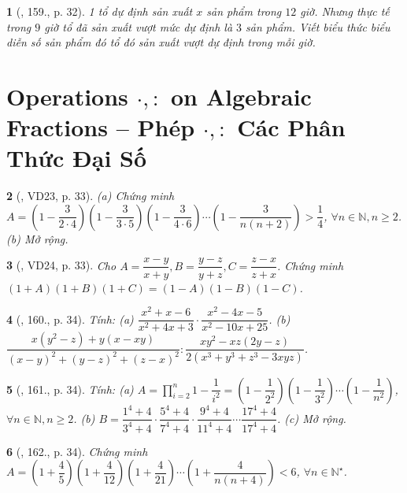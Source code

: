 \documentclass{article}
\newtheorem{baitoan}{}
\begin{document}
\begin{baitoan}[\cite{Tuyen_Toan_8}, 159., p. 32]
	1 tổ dự định sản xuất $x$ sản phẩm trong $12$ giờ. Nhưng thực tế trong $9$ giờ tổ đã sản xuất vượt mức dự định là $3$ sản phẩm. Viết biểu thức biểu diễn số sản phẩm đó tổ đó sản xuất vượt dự định trong mỗi giờ.
\end{baitoan}


\section{Operations $\cdot,:$ on Algebraic Fractions -- Phép $\cdot,:$ Các Phân Thức Đại Số}

\begin{baitoan}[\cite{Tuyen_Toan_8}, VD23, p. 33]
	(a) Chứng minh $A = \left(1 - \dfrac{3}{2\cdot4}\right)\left(1 - \dfrac{3}{3\cdot5}\right)\left(1 - \dfrac{3}{4\cdot6}\right)\cdots\left(1 - \dfrac{3}{n(n + 2)}\right) > \dfrac{1}{4}$, $\forall n\in\mathbb{N},n\ge2$. (b) Mở rộng.
\end{baitoan}

\begin{baitoan}[\cite{Tuyen_Toan_8}, VD24, p. 33]
	Cho $A = \dfrac{x - y}{x + y},B = \dfrac{y - z}{y + z},C = \dfrac{z - x}{z + x}$. Chứng minh $(1 + A)(1 + B)(1 + C) = (1 - A)(1 - B)(1 - C)$.
\end{baitoan}

\begin{baitoan}[\cite{Tuyen_Toan_8}, 160., p. 34]
	Tính: (a) $\dfrac{x^2 + x - 6}{x^2 + 4x + 3}\cdot\dfrac{x^2 - 4x - 5}{x^2 - 10x + 25}$. (b) $\dfrac{x(y^2 - z) + y(x - xy)}{(x - y)^2 + (y - z)^2 + (z - x)^2}:\dfrac{xy^2 - xz(2y - z)}{2(x^3 + y^3 + z^3 - 3xyz)}$.
\end{baitoan}

\begin{baitoan}[\cite{Tuyen_Toan_8}, 161., p. 34]
	Tính: (a) $A = \prod_{i=2}^n 1 - \dfrac{1}{i^2} = \left(1 - \dfrac{1}{2^2}\right)\left(1 - \dfrac{1}{3^2}\right)\cdots\left(1 - \dfrac{1}{n^2}\right)$, $\forall n\in\mathbb{N},n\ge2$. (b) $B = \dfrac{1^4 + 4}{3^4 + 4}\cdot\dfrac{5^4 + 4}{7^4 + 4}\cdot\dfrac{9^4 + 4}{11^4 + 4}\cdots\dfrac{17^4 + 4}{17^4 + 4}$. (c) Mở rộng.
\end{baitoan}

\begin{baitoan}[\cite{Tuyen_Toan_8}, 162., p. 34]
	Chứng minh $A = \left(1 + \dfrac{4}{5}\right)\left(1 + \dfrac{4}{12}\right)\left(1 + \dfrac{4}{21}\right)\cdots\left(1 + \dfrac{4}{n(n + 4)}\right) < 6$, $\forall n\in\mathbb{N}^\star$.
\end{baitoan}
\end{document}
